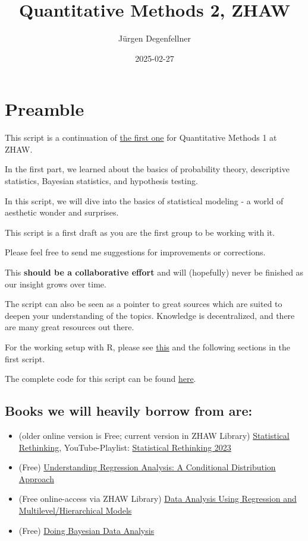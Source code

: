 \documentclass[
]{book}
\title{Quantitative Methods 2, ZHAW}
\author{Jürgen Degenfellner}
\date{2025-02-27}
\providecommand{\tightlist}{%
  \setlength{\itemsep}{0pt}\setlength{\parskip}{0pt}}
\begin{document}
\maketitle

{
\setcounter{tocdepth}{1}
\tableofcontents
}
\chapter{Preamble}\label{intro0}

This script is a continuation of
\href{https://jdegenfellner.github.io/Script_QM1_ZHAW/}{the first one} for Quantitative Methods 1
at ZHAW.

In the first part, we learned about the basics of probability theory,
descriptive statistics, Bayesian statistics, and hypothesis testing.

In this script, we will dive into the basics of statistical modeling -
a world of aesthetic wonder and surprises.

This script is a first draft as you are the first group to be working with it.

Please feel free to send me suggestions for improvements or corrections.

This \textbf{should be a collaborative effort} and will (hopefully)
never be finished as our insight grows over time.

The script can also be seen as a pointer to great sources which are
suited to deepen your understanding of the topics. Knowledge is decentralized,
and there are many great resources out there.

For the working setup with R, please
see \href{https://jdegenfellner.github.io/Script_QM1_ZHAW/index.html\#section}{this}
and the following sections in the first script.

The complete code for this script can be found
\href{https://github.com/jdegenfellner/Script_QM2_ZHAW}{here}.

\section{Books we will heavily borrow from are:}\label{books-we-will-heavily-borrow-from-are}

\begin{itemize}
\tightlist
\item
  (older online version is Free; current version in ZHAW Library) \href{https://civil.colorado.edu/~balajir/CVEN6833/bayes-resources/RM-StatRethink-Bayes.pdf}{Statistical Rethinking}, YouTube-Playlist: \href{https://youtu.be/FdnMWdICdRs?si=q2py5QVY_L299hEa}{Statistical Rethinking 2023}
\item
  (Free) \href{https://vdoc.pub/documents/understanding-regression-analysis-a-conditional-distribution-approach-84oqjr8sqva0}{Understanding Regression Analysis: A Conditional Distribution Approach}
\item
  (Free online-access via ZHAW Library) \href{http://www.stat.columbia.edu/~gelman/arm/}{Data Analysis Using Regression and Multilevel/Hierarchical Models}
\item
  (Free) \href{https://nyu-cdsc.github.io/learningr/assets/kruschke_bayesian_in_R.pdf}{Doing Bayesian Data Analysis}
\end{itemize}
\end{document}
